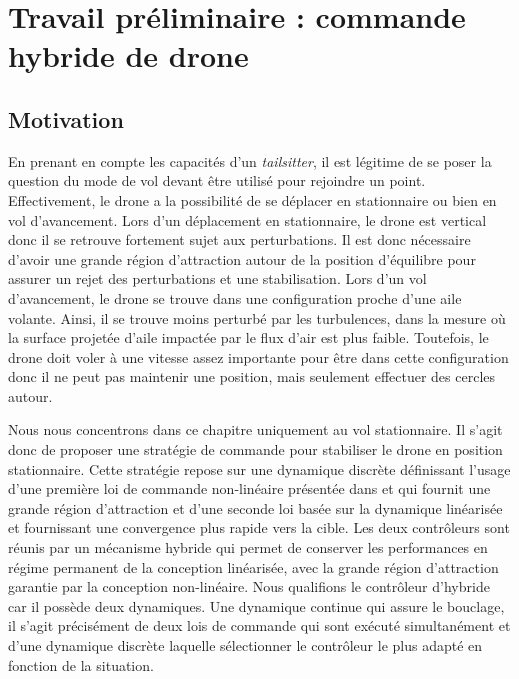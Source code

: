 \chapter{Travail préliminaire : commande hybride de drone}
\label{chap:hybrid}
\minitoc




\section{Motivation}
En prenant en compte les capacités d'un \textit{tailsitter}, il est légitime de se poser la question du mode de vol devant être utilisé pour rejoindre un point. Effectivement, le drone a la possibilité de se déplacer en stationnaire ou bien en vol d'avancement. Lors d'un déplacement en stationnaire, le drone est vertical donc il se retrouve fortement sujet aux perturbations. Il est donc nécessaire d'avoir une grande région d'attraction autour de la position d'équilibre pour assurer un rejet des perturbations et une stabilisation. Lors d'un vol d'avancement, le drone se trouve dans une configuration proche d'une aile volante. Ainsi, il se trouve moins perturbé par les turbulences, dans la mesure où la surface projetée d'aile impactée par le flux d'air est plus faible. Toutefois, le drone doit voler à une vitesse assez importante pour être dans cette configuration donc il ne peut pas maintenir une position, mais seulement effectuer des cercles autour. 

Nous nous concentrons dans ce chapitre uniquement au vol stationnaire. Il s'agit donc de proposer une stratégie de commande pour stabiliser le drone en position stationnaire. Cette stratégie repose sur une dynamique discrète définissant l'usage d'une première loi de commande non-linéaire présentée dans \cite{2020e-MicCenZacFra} et qui fournit une grande région d'attraction et d'une seconde loi basée sur la dynamique linéarisée et fournissant une convergence plus rapide vers la cible. Les deux contrôleurs sont réunis par un mécanisme hybride qui permet de conserver les performances en régime permanent de la conception linéarisée, avec la grande région d'attraction garantie par la conception non-linéaire.
{ \color{blue}
  Nous qualifions le contrôleur d'hybride car il possède deux dynamiques. Une dynamique continue qui assure le bouclage, il s'agit précisément de deux lois de commande qui sont exécuté simultanément et d'une dynamique discrète laquelle sélectionner le contrôleur le plus adapté en fonction de la situation.
}

